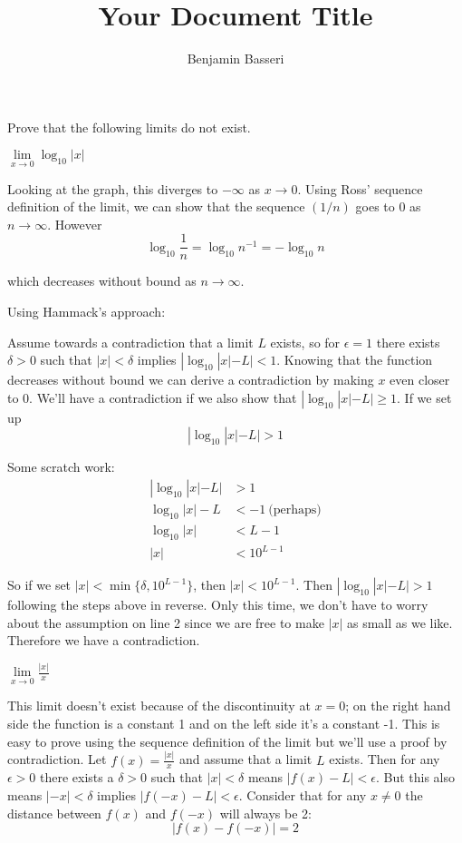 \documentclass{article}
\title{Your Document Title}
\author{Benjamin Basseri}
\begin{document}
\maketitle
Prove that the following limits do not exist.
\begin{problem}
$\lim\limits_{x \to 0} \log_{10} |x|$
\end{problem}
Looking at the graph, this diverges to $-\infty$ as $x \to 0$. Using Ross' sequence definition of the limit, we can show that the sequence $(1/n)$ goes to 0 as $n \to \infty$. However
$$\log_{10} \frac{1}{n} = \log_{10} n^{-1} = - \log_{10} n$$

which decreases without bound as $n \to \infty$.


Using Hammack's approach:

Assume towards a contradiction that a limit $L$ exists, so for $\epsilon = 1$ there exists $\delta > 0$ such that $|x| < \delta$ implies $|\log_{10} |x| - L | < 1$. Knowing that the function decreases without bound we can derive a contradiction by making $x$ even closer to 0. We'll have a contradiction if we also show that $|\log_{10}|x| - L | \geq 1$. If we set up
$$|\log_{10} |x| - L | > 1$$

Some scratch work:
\begin{align*}
  |\log_{10} |x| - L | & > 1                     \\
  \log_{10} |x| - L    & < -1 \ \text{(perhaps)} \\
  \log_{10} |x|        & < L - 1                 \\
  |x|                  & < 10^{L - 1}
\end{align*}

So if we set $|x| < \min\{\delta, 10^{L -1 }\}$, then $|x| < 10^{L - 1}$. Then $|\log_{10} |x| - L| > 1$ following the steps above in reverse. Only this time, we don't have to worry about the assumption on line 2 since we are free to make $|x|$ as small as we like. Therefore we have a contradiction.

\begin{problem}
$\lim\limits_{x \to 0} \frac{|x|}{x}$
\end{problem}

This limit doesn't exist because of the discontinuity at $x = 0$; on the right hand side the function is a constant 1 and on the left side it's a constant -1. This is easy to prove using the sequence definition of the limit but we'll use a proof by contradiction. Let $f(x) = \frac{|x|}{x}$ and assume that a limit $L$ exists. Then for any $\epsilon > 0$ there exists a $\delta > 0$ such that $|x| < \delta$ means $|f(x) - L| < \epsilon$. But this also means $|-x| < \delta$ implies $|f(-x) - L| < \epsilon$. Consider that for any $x \neq 0$ the distance between $f(x)$ and $f(-x)$ will always be 2:
$$|f(x) - f(-x)| = 2$$
\end{document}
